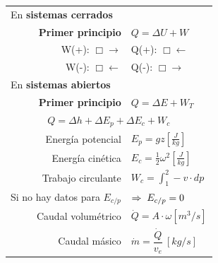 \documentclass[11pt,a4paper,twocolumn]{article}
\begin{document}
	\begin{tcolorbox}[colback=white!97!brown, colframe=brown!15!gray, breakable]
		
	
		\begin{tabular}{r l}
		
			\multicolumn{2}{l}{En \textbf{sistemas cerrados}} \\

\vspace{.1cm}			{\textcolor{brown!50!black}{\textbf{Primer principio}}}& $Q = \Delta U + W$\\
\vspace{.1cm}			W(+): $\Box \rightarrow$& Q(+): $\Box \leftarrow$\\
\vspace{.1cm}			W(-): $\Box \leftarrow$  &   Q(-): $\Box \rightarrow$ \\

		

	\multicolumn{2}{l}{\vspace{.1cm} En \textbf{sistemas abiertos}} \\
	\vspace{.1cm}		{\textcolor{brown!50!black}{\textbf{Primer principio}}} & $Q=\Delta E+W_{T}$\\
	\multicolumn{2}{c}{$Q=\Delta h + \Delta E_{p} +\Delta E_{c} + W_{c}$} \\
	\vspace{.1cm}		Energía potencial & $E_p = gz \left[\frac{J}{kg}\right]$ \\
	\vspace{.1cm}		Energía cinética & $E_c = \frac{1}{2}\omega^{2} \left[\frac{J}{kg}\right]$ \\
	\vspace{.1cm}		Trabajo circulante &$W_{c}=\displaystyle\int_{1}^{2} -v \cdot dp$\\
	\vspace{.2cm}	Si no hay datos para $E_{c/p}$ & $\Rightarrow \hspace{.1cm} E_{c/p}=0$ \\
	
	\vspace{.1cm} Caudal volumétrico 			& $\dot{Q}=A\cdot \omega [m^{3}/s] $ \\
	\vspace{.1cm} Caudal másico					& $\dot{m}= \dfrac{\dot{Q}}{v_{e}} \ [kg/s] $ \\


\end{tabular}
\end{tcolorbox}
\end{document}
